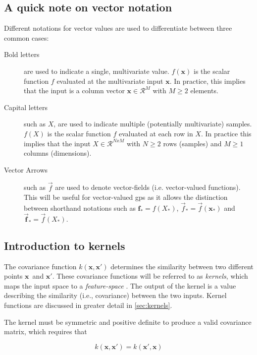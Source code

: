 \subsection{A quick note on vector notation}
Different notations for vector values are used to differentiate between three common cases:
\begin{description}
\item[Bold letters] are used to indicate a single, multivariate value. $f(\boldsymbol{x})$ is the scalar function $f$ evaluated at the multivariate input $\boldsymbol{x}$. In practice, this implies that the input is a column vector $\boldsymbol{x} \in \mathcal{R}^{M}$ with $M \geq 2$ elements. 
\item[Capital letters] such as $X$, are used to indicate multiple (potentially multivariate) samples. $f(X)$ is the scalar function $f$ evaluated at each row in $X$. In practice this implies that the input $X \in \mathcal{R}^{N x M}$ with $N \geq 2$ rows (samples) and $M \geq 1$ columns (dimensions).
\item[Vector Arrows] such as $\vec{f}$ are used to denote vector-fields (i.e. vector-valued functions). This will be useful for vector-valued \acrshort{gp}s as it allows the distinction between shorthand notations such as $\boldsymbol{f}_* = f(X_*)$, $\vec{f}_* = \vec{f}(\boldsymbol{x}_*)$ and $\vec{\boldsymbol{f}}_* = \vec{f}(X_*)$.
\end{description}

\subsection{Introduction to kernels}
The covariance function $k(\boldsymbol{x}, \boldsymbol{x}')$ determines the similarity between two different points $\boldsymbol{x}$ and $\boldsymbol{x}'$. These covariance functions will be referred to as \textit{kernels}, which maps the input space to a \textit{feature-space} \cite{rasmussen}. The output of the kernel is a value describing the similarity (i.e., covariance) between the two inputs. Kernel functions are discussed in greater detail in \cref{sec:kernels}.

The kernel must be symmetric and positive definite to produce a valid covariance matrix, which requires that

\begin{equation}
    k(\boldsymbol{x}, \boldsymbol{x}') = k(\boldsymbol{x}', \boldsymbol{x})
\end{equation}

